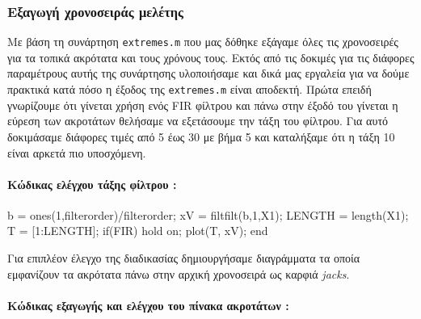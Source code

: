 \documentclass[11pt,]{article}
\newenvironment{Shaded}{}{}
\newcommand{\FloatTok}[1]{\textcolor[rgb]{0.25,0.63,0.44}{#1}}
\newcommand{\NormalTok}[1]{#1}
\let\oldparagraph\paragraph
\renewcommand{\paragraph}[1]{\oldparagraph{#1}\mbox{}}
\begin{document}
\hypertarget{ux3b5ux3beux3b1ux3b3ux3c9ux3b3ux3ae-ux3c7ux3c1ux3bfux3bdux3bfux3c3ux3b5ux3b9ux3c1ux3acux3c2-ux3bcux3b5ux3bbux3adux3c4ux3b7ux3c2}{%
\subsubsection{Εξαγωγή χρονοσειράς
μελέτης}\label{ux3b5ux3beux3b1ux3b3ux3c9ux3b3ux3ae-ux3c7ux3c1ux3bfux3bdux3bfux3c3ux3b5ux3b9ux3c1ux3acux3c2-ux3bcux3b5ux3bbux3adux3c4ux3b7ux3c2}}

Με βάση τη συνάρτηση \texttt{extremes.m} που μας δόθηκε εξάγαμε όλες τις
χρονοσειρές για τα τοπικά ακρότατα και τους χρόνους τους. Εκτός από τις
δοκιμές για τις διάφορες παραμέτρους αυτής της συνάρτησης υλοποιήσαμε
και δικά μας εργαλεία για να δούμε πρακτικά κατά πόσο η έξοδος της
\texttt{extremes.m} είναι αποδεκτή. Πρώτα επειδή γνωρίζουμε ότι γίνεται
χρήση ενός FIR φίλτρου και πάνω στην έξοδό του γίνεται η εύρεση των
ακροτάτων θελήσαμε να εξετάσουμε την τάξη του φίλτρου. Για αυτό
δοκιμάσαμε διάφορες τιμές από 5 έως 30 με βήμα 5 και καταλήξαμε ότι η
τάξη 10 είναι αρκετά πιο υποσχόμενη.

\hypertarget{ux3baux3ceux3b4ux3b9ux3baux3b1ux3c2-ux3b5ux3bbux3adux3b3ux3c7ux3bfux3c5-ux3c4ux3acux3beux3b7ux3c2-ux3c6ux3afux3bbux3c4ux3c1ux3bfux3c5}{%
\paragraph{Κώδικας ελέγχου τάξης φίλτρου
:}\label{ux3baux3ceux3b4ux3b9ux3baux3b1ux3c2-ux3b5ux3bbux3adux3b3ux3c7ux3bfux3c5-ux3c4ux3acux3beux3b7ux3c2-ux3c6ux3afux3bbux3c4ux3c1ux3bfux3c5}}

\begin{Shaded}
\begin{Highlighting}[]
\NormalTok{  b = ones(}\FloatTok{1}\NormalTok{,filterorder)/filterorder;}
\NormalTok{  xV = filtfilt(b,}\FloatTok{1}\NormalTok{,X1);}
\NormalTok{  LENGTH = length(X1);}
\NormalTok{  T = [}\FloatTok{1}\NormalTok{:LENGTH];}
\NormalTok{  if(FIR)}
\NormalTok{    hold on;}
\NormalTok{    plot(T, xV);}
\NormalTok{  end}
\end{Highlighting}
\end{Shaded}

Για επιπλέον έλεγχο της διαδικασίας δημιουργήσαμε διαγράμματα τα οποία
εμφανίζουν τα ακρότατα πάνω στην αρχική χρονοσειρά ως καρφιά
\emph{jacks}.

\hypertarget{ux3baux3ceux3b4ux3b9ux3baux3b1ux3c2-ux3b5ux3beux3b1ux3b3ux3c9ux3b3ux3aeux3c2-ux3baux3b1ux3b9-ux3b5ux3bbux3adux3b3ux3c7ux3bfux3c5-ux3c4ux3bfux3c5-ux3c0ux3afux3bdux3b1ux3baux3b1-ux3b1ux3baux3c1ux3bfux3c4ux3acux3c4ux3c9ux3bd}{%
\paragraph{Κώδικας εξαγωγής και ελέγχου του πίνακα ακροτάτων
:}\label{ux3baux3ceux3b4ux3b9ux3baux3b1ux3c2-ux3b5ux3beux3b1ux3b3ux3c9ux3b3ux3aeux3c2-ux3baux3b1ux3b9-ux3b5ux3bbux3adux3b3ux3c7ux3bfux3c5-ux3c4ux3bfux3c5-ux3c0ux3afux3bdux3b1ux3baux3b1-ux3b1ux3baux3c1ux3bfux3c4ux3acux3c4ux3c9ux3bd}}
\end{document}
